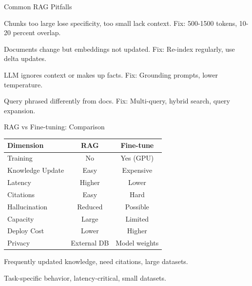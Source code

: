 \documentclass[aspectratio=169,11pt]{beamer}
\begin{document}
\begin{frame}{Common RAG Pitfalls}
  \begin{warningbox}
    Chunks too large lose specificity, too small lack context. Fix: 500-1500 tokens, 10-20 percent overlap.
  \end{warningbox}

  \begin{warningbox}
    Documents change but embeddings not updated. Fix: Re-index regularly, use delta updates.
  \end{warningbox}

  \begin{warningbox}
    LLM ignores context or makes up facts. Fix: Grounding prompts, lower temperature.
  \end{warningbox}

  \begin{warningbox}
    Query phrased differently from docs. Fix: Multi-query, hybrid search, query expansion.
  \end{warningbox}
\end{frame}

\begin{frame}{RAG vs Fine-tuning: Comparison}
  \begin{center}
    \small
    \begin{tabular}{|l|c|c|}
      \hline
      \textbf{Dimension} & \textbf{RAG} & \textbf{Fine-tune} \\
      \hline
      Training & No & Yes (GPU) \\
      Knowledge Update & Easy & Expensive \\
      Latency & Higher & Lower \\
      Citations & Easy & Hard \\
      Hallucination & Reduced & Possible \\
      Capacity & Large & Limited \\
      Deploy Cost & Lower & Higher \\
      Privacy & External DB & Model weights \\
      \hline
    \end{tabular}
  \end{center}

  \begin{tipbox}
    Frequently updated knowledge, need citations, large datasets.
  \end{tipbox}

  \begin{tipbox}
    Task-specific behavior, latency-critical, small datasets.
  \end{tipbox}
\end{frame}
\end{document}
